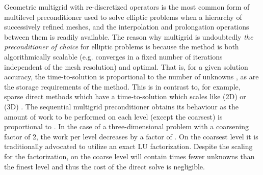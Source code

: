 \documentclass[]{siamart0216}
\begin{document}
Geometric multigrid with re-discretized operators is the most common form of multilevel preconditioner used to solve 
elliptic problems when a hierarchy of successively refined meshes, and the interpolation and prolongation operations between them 
is readily available. 
The reason why multigrid is undoubtedly \textit{the preconditioner of choice} for elliptic problems 
is because the method is both algorithmically scalable (e.g. converges in a fixed number of 
iterations independent of the mesh resolution) and optimal. 
That is, for a given solution accuracy, the time-to-solution 
is proportional to the number of unknowns , as are the storage requirements of the method. 
This is in contrast to, for example, sparse direct methods which have a time-to-solution which 
scales like  (2D) or  (3D)  \cite{li2007use}.
The sequential multigrid preconditioner obtains its  behaviour as the amount of work 
to be performed on each level  (except the coarsest) is proportional to . 
In the case of a three-dimensional problem with a coarsening factor of 2, the work per level decreases by a factor of . 
On the coarsest level  it is traditionally advocated to utilize an exact LU factorization. 
Despite the  scaling for the factorization,  on the coarse level  
will contain  times fewer unknowns than the finest level and thus the cost of the direct solve is negligible.   
\end{document}
